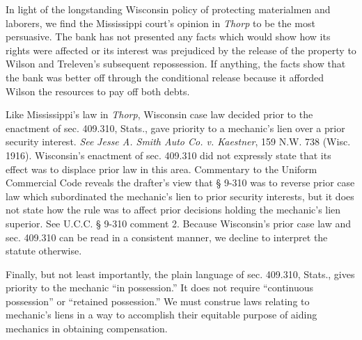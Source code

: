 In light of the longstanding Wisconsin policy of protecting materialmen and
laborers, we find the Mississippi court's opinion in \emph{Thorp} to be the most
persuasive. The bank has not presented any facts which would show how its
rights were affected or its interest was prejudiced by the release of the
property to Wilson and Treleven's subsequent repossession. If anything, the
facts show that the bank was better off through the conditional release because
it afforded Wilson the resources to pay off both debts.

Like Mississippi's law in \textit{Thorp}, Wisconsin case law decided prior to
the enactment of sec. 409.310, Stats., gave priority to a mechanic's lien over
a prior security interest. \textit{See} \textit{Jesse A. Smith Auto Co. v.
Kaestner}, 159 N.W. 738 (Wisc. 1916). Wisconsin's enactment of sec. 409.310 did
not expressly state that its effect was to displace prior law in this area.
Commentary to the Uniform Commercial Code reveals the drafter's view that {\S}
9-310 was to reverse prior case law which subordinated the mechanic's lien to
prior security interests, but it does not state how the rule was to affect
prior decisions holding the mechanic's lien superior. See U.C.C. {\S} 9-310
comment 2. Because Wisconsin's prior case law and sec. 409.310 can be read in a
consistent manner, we decline to interpret the statute otherwise.

Finally, but not least importantly, the plain language of sec. 409.310, Stats.,
gives priority to the mechanic ``in possession.'' It does not require
``continuous possession'' or ``retained possession.'' We must construe laws
relating to mechanic's liens in a way to accomplish their equitable purpose of
aiding mechanics in obtaining compensation.

